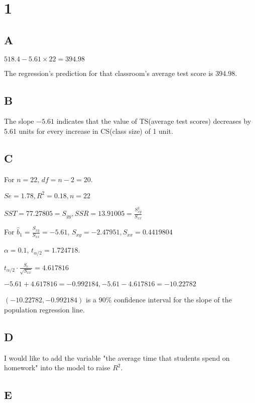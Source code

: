 \documentclass{article}
\begin{document}
\section*{1}

\subsection*{A}

$518.4-5.61\times 22=394.98$

The regression’s prediction for that
classroom’s average test score is 394.98.

\subsection*{B}

The slope $-5.61$ indicates that the value of TS(average test scores) decreases by 5.61 units for every increase in CS(class size) of 1 unit.

\subsection*{C}

For $n=22$, $df=n-2=20$. 

$Se=1.78, R^2=0.18, n=22$

$ SST=77.27805=S_{yy}, SSR= 13.91005=\frac{S_{xy}^2}{S_{xx}}$

For $\hat{b}_1=\frac{S_{xy}}{S_{xx}}=-5.61$, $S_{xy}=-2.47951, S_{xx}=0.4419804$

$\alpha=0.1$, $t_{\alpha/2}=1.724718$.

$t_{\alpha/2}\cdot \frac{S_e}{\sqrt{S_{xx}}}=4.617816$

$-5.61+4.617816=-0.992184, -5.61-4.617816=-10.22782$

$(-10.22782,-0.992184)$ is a 90\% confidence interval for the slope of the population regression line.

\subsection*{D}

I would like to add the variable "the average time that students spend on homework" into the model to raise $R^2$.

\subsection*{E}\noindent
\end{document}
